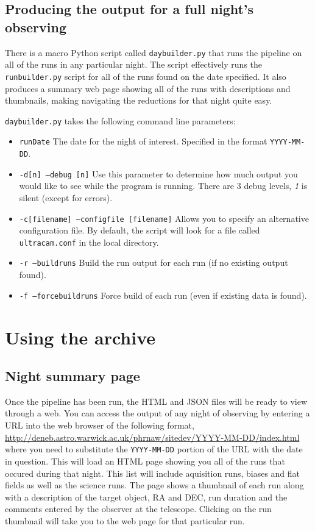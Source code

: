 \subsection{Producing the output for a full night's observing}
There is a macro Python script called \texttt{daybuilder.py} that runs the pipeline on all of the runs in any particular night. The script effectively runs the \texttt{runbuilder.py} script for all of the runs found on the date specified. It also produces a summary web page showing all of the runs with descriptions and thumbnails, making navigating the reductions for that night quite easy.

\texttt{daybuilder.py} takes the following command line parameters:
\begin{itemize}
  \item \texttt{runDate} The date for the night of interest. Specified in the format \texttt{YYYY-MM-DD}.
  \item \texttt{-d[n] --debug [n]} Use this parameter to determine how much output you would like to see while the program is running. There are 3 debug levels, \emph{1} is silent (except for errors).
   \item \texttt{-c[filename] --configfile [filename]} Allows you to specify an alternative configuration file. By default, the script will look for a file called \texttt{ultracam.conf} in the local directory. 
  \item \texttt{-r --buildruns} Build the run output for each run (if no existing output found).
  \item \texttt{-f --forcebuildruns}  Force build of each run (even if existing data is found).
\end{itemize}
 

\section{Using the archive} 

\subsection{Night summary page}
Once the pipeline has been run, the HTML and JSON files will be ready to view through a web. You can access the output of any night of observing by entering a URL into the web browser of the following format, \url{http://deneb.astro.warwick.ac.uk/phrnaw/sitedev/YYYY-MM-DD/index.html} where you need to substitute the \texttt{YYYY-MM-DD} portion of the URL with the date in question. This will load an HTML page showing you all of the runs that occured during that night. This list will include aquisition runs, biases and flat fields as well as the science runs. The page shows a thumbnail of each run along with a description of the target object, RA and DEC, run duration and the comments entered by the observer at the telescope. Clicking on the run thumbnail will take you to the web page for that particular run. 


